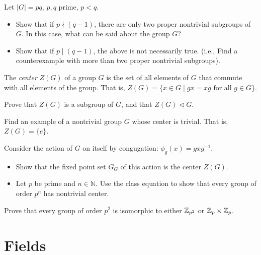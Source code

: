 \begin{problem}
Let $\lvert G \rvert = pq$, $p,q$ prime, $p<q$.
\begin{itemize}
 \item Show that if $p \nmid (q-1)$, there are only two proper nontrivial subgroups of $G$.  In this case, what can be said about the group $G$?
 \item Show that if $p \mid (q-1)$, the above is not necessarily true. (i.e., Find a counterexample with more than two proper nontrivial subgroups).
\end{itemize}
\end{problem}



\begin{definition}
 The \emph{center} $Z(G)$ of a group $G$ is the set of all elements of $G$ that commute with all elements of the group.  That is, $Z(G) = \{ x \in G \mid gx = xg \mbox{ for all } g \in G \}$.
\end{definition}

\begin{problem}
Prove that $Z(G)$ is a subgroup of $G$, and that $Z(G)\lhd G$.
\end{problem}

\begin{problem}
Find an example of a nontrivial group $G$ whose center is trivial.  That is, $Z(G) = \{e\}$.
\end{problem}



\begin{problem}
Consider the action of $G$ on itself by congugation: $\phi_g(x) = gxg^{-1}$.
\begin{itemize}
 \item Show that the fixed point set $G_G$ of this action is the center $Z(G)$.
 \item Let $p$ be prime and $n\in \mathbb{N}$.  Use the class equation to show that every group of order $p^n$ has nontrivial center.
\end{itemize}
\end{problem}



\begin{problem}
Prove that every group of order $p^2$ is isomorphic to either $\mathbb{Z}_{p^2}$ or $\mathbb{Z}_p\times \mathbb{Z}_p$.
\end{problem}

\chapter{Fields}

